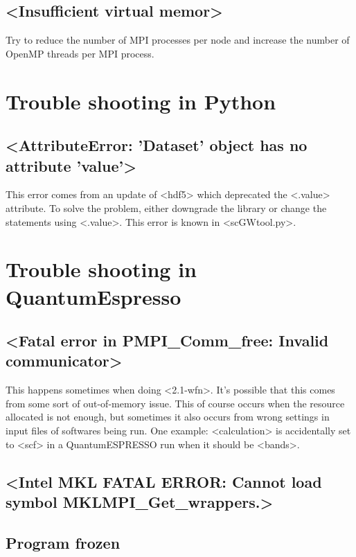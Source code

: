 \documentclass[hyperref, a4paper, 12pt]{report}
\def\texttt#1{<#1>}%
\newcommand{\shortcode}[1]{\texttt{#1}}
\begin{document}
\subsection{\shortcode{Insufficient virtual memor}}

Try to reduce the number of MPI processes per node 
and increase the number of OpenMP threads per MPI process.


\section{Trouble shooting in Python}

\subsection{\shortcode{AttributeError: 'Dataset' object has no attribute 'value'}}

This error comes from an update of \shortcode{hdf5} 
which deprecated the \shortcode{.value} attribute.
To solve the problem, 
either downgrade the library 
or change the statements using \shortcode{.value}.
This error is known in \shortcode{scGWtool.py}.

\section{Trouble shooting in QuantumEspresso}

\subsection{\shortcode{Fatal error in PMPI_Comm_free: Invalid communicator}}

This happens sometimes when doing \shortcode{2.1-wfn}.
It's possible that this comes from some sort of out-of-memory issue.
This of course occurs when the resource allocated is not enough,
but sometimes it also occurs from wrong settings in input files of
softwares being run.
One example: \shortcode{calculation} is accidentally set to \shortcode{scf} 
in a QuantumESPRESSO run 
when it should be \shortcode{bands}.

\subsection{\shortcode{Intel MKL FATAL ERROR: Cannot load symbol MKLMPI_Get_wrappers.}}



\subsection{Program frozen}
\end{document}
